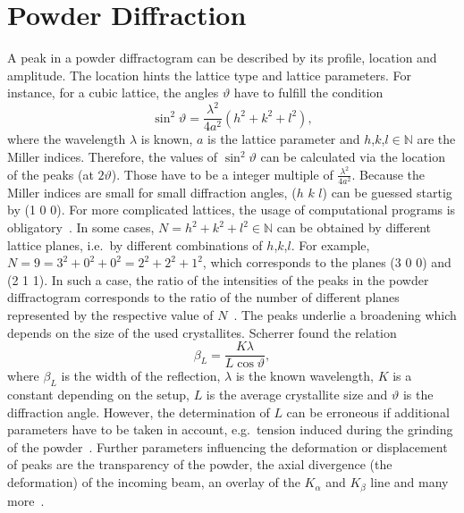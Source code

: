  
\section{Powder Diffraction}\label{sec:Q7}

A peak in a powder diffractogram can be described by its profile, location and amplitude. The location hints the lattice type and lattice parameters. For instance, for a cubic lattice, the angles $\vartheta$ have to fulfill the condition 
\begin{equation}
    \sin^2\vartheta = \frac{\lambda^2}{4a^2}(h^2+k^2+l^2),
\end{equation}
where the wavelength $\lambda$ is known, $a$ is the lattice parameter and $h$,$k$,$l \in \mathbb{N}$ are the Miller indices. Therefore, the values of $\sin^2\vartheta$ can be calculated via the location of the peaks (at $2\vartheta$). Those have to be a integer multiple of $\frac{\lambda^2}{4a^2}$. Because the Miller indices are small for small diffraction angles, ($h$ $k$ $l$) can be guessed startig by (1 0 0). For more complicated lattices, the usage of computational programs is obligatory~\cite{Bohm.2021}. In some cases, $N=h^2+k^2+l^2 \in \mathbb{N}$ can be obtained by different lattice planes, i.e.~by different combinations of $h$,$k$,$l$. For example, $N=9=3^2+0^2+0^2=2^2+2^2+1^2$, which corresponds to the planes (3 0 0) and (2 1 1). In such a case, the ratio of the intensities of the peaks in the powder diffractogram corresponds to the ratio of the number of different planes represented by the respective value of $N$~\cite{Bohm.2021}. The peaks underlie a broadening which depends on the size of the used crystallites. Scherrer found the relation
\begin{equation}
    \beta_L = \frac{K\lambda}{L\cos\vartheta},
\end{equation}
where $\beta_L$ is the width of the reflection, $\lambda$ is the known wavelength, $K$ is a constant depending on the setup, $L$ is the average crystallite size and $\vartheta$ is the diffraction angle. However, the determination of $L$ can be erroneous if additional parameters have to be taken in account, e.g.~tension induced during the grinding of the powder~\cite{Bohm.2021}. Further parameters influencing the deformation or displacement of peaks are the transparency of the powder, the axial divergence (the deformation) of the incoming beam, an overlay of the $K_{\alpha}$ and $K_{\beta}$ line and many more~\cite{Allmann.2003}. \par 
